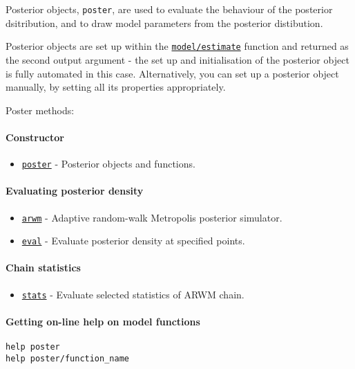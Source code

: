


	Posterior objects, \texttt{poster}, are used to evaluate the behaviour
of the posterior dsitribution, and to draw model parameters from the
posterior distibution.

Posterior objects are set up within the
\href{model/estimate}{\texttt{model/estimate}} function and returned as
the second output argument - the set up and initialisation of the
posterior object is fully automated in this case. Alternatively, you can
set up a posterior object manually, by setting all its properties
appropriately.

Poster methods:

\paragraph{Constructor}\label{constructor}

\begin{itemize}
\itemsep1pt\parskip0pt
\item
  \href{poster/poster}{\texttt{poster}} - Posterior objects and
  functions.
\end{itemize}

\paragraph{Evaluating posterior
density}\label{evaluating-posterior-density}

\begin{itemize}
\itemsep1pt\parskip0pt
\item
  \href{poster/arwm}{\texttt{arwm}} - Adaptive random-walk Metropolis
  posterior simulator.
\item
  \href{poster/eval}{\texttt{eval}} - Evaluate posterior density at
  specified points.
\end{itemize}

\paragraph{Chain statistics}\label{chain-statistics}

\begin{itemize}
\itemsep1pt\parskip0pt
\item
  \href{poster/stats}{\texttt{stats}} - Evaluate selected statistics of
  ARWM chain.
\end{itemize}

\paragraph{Getting on-line help on model
functions}\label{getting-on-line-help-on-model-functions}

\begin{verbatim}
help poster
help poster/function_name
\end{verbatim}


